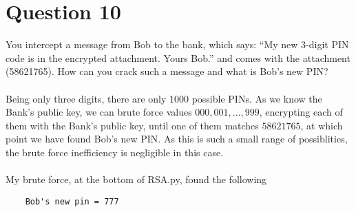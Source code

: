 \documentclass[a4paper,12pt]{article}
\begin{document}
\section*{Question 10}
You intercept a message from Bob to the bank, which says: “My new 3-digit PIN code is in the encrypted attachment. Yours Bob.” and comes with the attachment (58621765). How can you crack such a message and what is Bob’s new PIN?\\\\
Being only three digits, there are only 1000 possible PINs. As we know the Bank's public key, we can brute force values $000, 001, ..., 999$, encrypting each of them with the Bank's public key, until one of them matches $58621765$, at which point we have found Bob's new PIN. As this is such a small range of possiblities, the brute force inefficiency is negligible in this case.\\\\My brute force, at the bottom of RSA.py, found the following
\begin{verbatim}
    Bob's new pin = 777
\end{verbatim}
\end{document}
